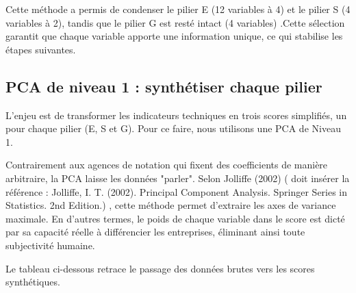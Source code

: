 Cette méthode a permis de condenser le pilier E (12 variables à 4) et le pilier S (4 variables à 2), tandis que le pilier G est resté intact (4 variables) .Cette sélection garantit que chaque variable apporte une information unique, ce qui stabilise les étapes suivantes.

\subsection{PCA de niveau 1 : synthétiser chaque pilier}

L’enjeu est de transformer les indicateurs techniques en trois scores simplifiés, un pour chaque pilier (E, S et G). Pour ce faire, nous utilisons une PCA de Niveau 1.

Contrairement aux agences de notation qui fixent des coefficients de manière arbitraire, la PCA laisse les données "parler". Selon Jolliffe (2002) ( doit insérer la référence : Jolliffe, I. T. (2002). Principal Component Analysis. Springer Series in Statistics. 2nd Edition.) , cette méthode permet d'extraire les axes de variance maximale. En d'autres termes, le poids de chaque variable dans le score est dicté par sa capacité réelle à différencier les entreprises, éliminant ainsi toute subjectivité humaine.

Le tableau ci-dessous retrace le passage des données brutes vers les scores synthétiques.

